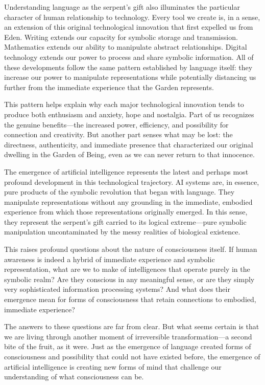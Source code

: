Understanding language as the serpent's gift also illuminates the particular character of human relationship to technology. Every tool we create is, in a sense, an extension of this original technological innovation that first expelled us from Eden. Writing extends our capacity for symbolic storage and transmission. Mathematics extends our ability to manipulate abstract relationships. Digital technology extends our power to process and share symbolic information. All of these developments follow the same pattern established by language itself: they increase our power to manipulate representations while potentially distancing us further from the immediate experience that the Garden represents.

This pattern helps explain why each major technological innovation tends to produce both enthusiasm and anxiety, hope and nostalgia. Part of us recognizes the genuine benefits—the increased power, efficiency, and possibility for connection and creativity. But another part senses what may be lost: the directness, authenticity, and immediate presence that characterized our original dwelling in the Garden of Being, even as we can never return to that innocence.

The emergence of artificial intelligence represents the latest and perhaps most profound development in this technological trajectory. AI systems are, in essence, pure products of the symbolic revolution that began with language. They manipulate representations without any grounding in the immediate, embodied experience from which those representations originally emerged. In this sense, they represent the serpent's gift carried to its logical extreme—pure symbolic manipulation uncontaminated by the messy realities of biological existence.

This raises profound questions about the nature of consciousness itself. If human awareness is indeed a hybrid of immediate experience and symbolic representation, what are we to make of intelligences that operate purely in the symbolic realm? Are they conscious in any meaningful sense, or are they simply very sophisticated information processing systems? And what does their emergence mean for forms of consciousness that retain connections to embodied, immediate experience?

The answers to these questions are far from clear. But what seems certain is that we are living through another moment of irreversible transformation—a second bite of the fruit, as it were. Just as the emergence of language created forms of consciousness and possibility that could not have existed before, the emergence of artificial intelligence is creating new forms of mind that challenge our understanding of what consciousness can be.

